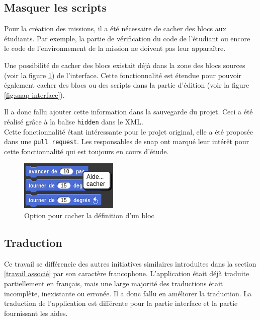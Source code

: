 \subsection{Masquer les scripts}
Pour la création des missions, il a été nécessaire de cacher des \glspl{bloc} aux étudiants. Par exemple, la partie de vérification du code de l'étudiant ou encore le code de l'environnement de la mission ne doivent pas leur apparaître. 

Une possibilité de cacher des \glspl{bloc} existait déjà dans la zone des \glspl{bloc} sources (voir la figure \ref{fig:cacher}) de l'interface. Cette fonctionnalité est étendue pour pouvoir également cacher des \glspl{bloc} ou des \glspl{script} dans la partie d'édition (voir la figure \ref{fig:snap interface}).

Il a donc fallu ajouter cette information dans la sauvegarde du projet. Ceci a été réalisé grâce à la balise \texttt{hidden} dans le XML.\\


Cette fonctionnalité étant intéressante pour le projet original, elle a été proposée dans une \texttt{pull request}. Les responsables de \gls{snap} ont marqué leur intérêt pour cette fonctionnalité qui est toujours en cours d'étude.
\begin{figure}
  \begin{center}
    \includegraphics[scale=0.5]{content/7-solution/2-snap/images/cacher}
    \caption{Option pour cacher la définition d'un bloc}
    \label{fig:cacher}
  \end{center}
\end{figure}

\subsection{Traduction}
Ce travail se différencie des autres initiatives similaires introduites dans la section \ref{travail associé} par son caractère francophone. L'application était déjà traduite partiellement en français, mais une large majorité des traductions était incomplète, inexistante ou erronée. Il a donc fallu en améliorer la traduction. La traduction de l'application est différente pour la partie interface et la partie fournissant les aides. 

